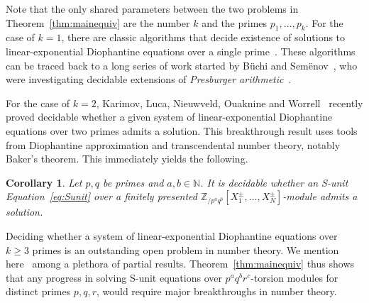 \documentclass[letterpaper, 11pt, thm-restate]{article}
\numberwithin{equation}{section}
\newcommand{\Z}{\mathbb{Z}}
\newcommand{\N}{\mathbb{N}}
\newcommand{\bb}{\boldsymbol{b}}
\newcommand{\bc}{\boldsymbol{c}}
\newcommand{\gen}[1]{\left\langle {#1} \right\rangle}
\newtheorem{cor}[thrm]{Corollary}
\theoremstyle{definition}
\theoremstyle{definition}
\theoremstyle{definition}
\newtheorem{rmk}[thrm]{Remark}
\begin{document}
Note that the only shared parameters between the two problems in Theorem~\ref{thm:mainequiv} are the number $k$ and the primes $p_1, \ldots, p_k$.
For the case of $k = 1$, there are classic algorithms that decide existence of solutions to linear-exponential Diophantine equations over a single prime~\cite{benedikt2023complexity}.
These algorithms can be traced back to a long series of work started by B\"{u}chi and Sem\"{e}nov~\cite{buchi1960weak, semenov1980certain}, who were investigating decidable extensions of \emph{Presburger arithmetic}~\cite{presburger1929uber}.

For the case of $k = 2$, Karimov, Luca, Nieuwveld, Ouaknine and Worrell~\cite{karimov2025decidability} recently proved decidable whether a given system of linear-exponential Diophantine equations over two primes admits a solution.
This breakthrough result uses tools from Diophantine approximation and transcendental number theory, notably Baker's theorem.
This immediately yields the following.

\begin{cor}\label{cor:twoprimes}
    Let $p, q$ be primes and $a, b \in \N$.
    It is decidable whether an S-unit Equation~\eqref{eq:Sunit} over a finitely presented $\Z_{/p^a q^b}[X_1^{\pm}, \ldots, X_N^{\pm}]$-module admits a solution.
\end{cor}

Deciding whether a system of linear-exponential Diophantine equations over $k \geq 3$ primes is an outstanding open problem in number theory.
We mention here~\cite{brenner1982exponential, alma991009821129706011, cao1999note, bajpai2023effective, berthe2024decidability} among a plethora of partial results.
Theorem~\ref{thm:mainequiv} thus shows that any progress in solving S-unit equations over $p^a q^b r^c$-torsion modules for distinct primes $p, q, r$, would require major breakthroughs in number theory.

\end{document}
